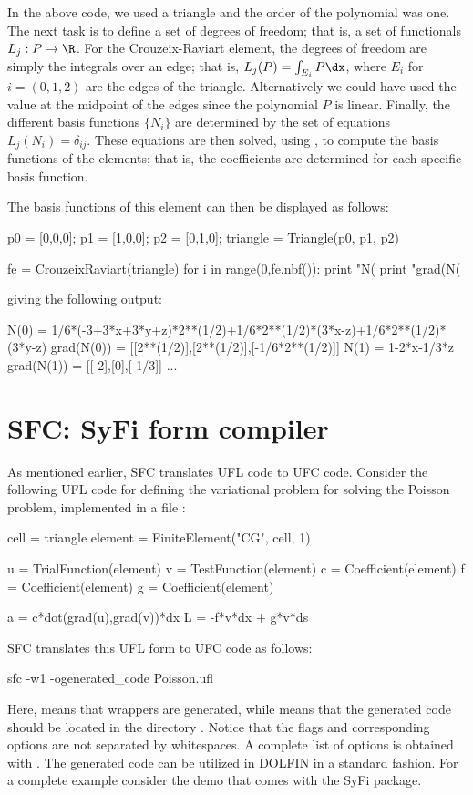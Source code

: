 In the above code, we used a triangle and the order of the polynomial
was one. The next task is to define a set of degrees of freedom; that is,
a set of functionals $L_j : P \rightarrow \R$.  For the Crouzeix-Raviart
element, the degrees of freedom are simply the integrals over an edge;
that is, $L_j(P) = \int_{E_i} P \dx$, where $E_i$ for $i=(0,1,2)$ are the
edges of the triangle. Alternatively we could have used the value at
the midpoint of the edges since the polynomial $P$ is linear.  Finally,
the different basis functions $\{N_i\}$ are determined by the set of
equations $L_j(N_i) = \delta_{ij}$.  These equations are then solved,
using , to compute the basis functions of the elements;
that is, the coefficients \emp{[a0\_0, a0\_1, a0\_2]} are determined for
each specific basis function.

The basis functions of this element can then be displayed as follows:
\begin{python}
p0 = [0,0,0]; p1 = [1,0,0]; p2 = [0,1,0];
triangle = Triangle(p0, p1, p2)

fe = CrouzeixRaviart(triangle)
for i in range(0,fe.nbf()):
  print "N(%
  print "grad(N(%
\end{python}
giving the following output:
\begin{c++}
N(0)       =  1/6*(-3+3*x+3*y+z)*2**(1/2)+1/6*2**(1/2)*(3*x-z)+1/6*2**(1/2)*(3*y-z)
grad(N(0)) =  [[2**(1/2)],[2**(1/2)],[-1/6*2**(1/2)]]
N(1)       =  1-2*x-1/3*z
grad(N(1)) =  [[-2],[0],[-1/3]]
...
\end{c++}

\section{SFC: SyFi form compiler}

As mentioned earlier, SFC translates UFL code to UFC code. Consider the
following UFL code for defining the variational problem for solving the
Poisson problem, implemented in a file :
\begin{python}
cell = triangle
element = FiniteElement("CG", cell, 1)

u = TrialFunction(element)
v = TestFunction(element)
c = Coefficient(element)
f = Coefficient(element)
g = Coefficient(element)

a = c*dot(grad(u),grad(v))*dx
L = -f*v*dx + g*v*ds
\end{python}
SFC translates this UFL form to UFC code as follows:
\begin{bash}
sfc -w1  -ogenerated_code Poisson.ufl
\end{bash}
Here,  means that \dolfin wrappers are generated, while
 means that the generated code should be
located in the directory . Notice that the flags
and corresponding options are not separated by whitespaces. A complete
list of options is obtained with .  The generated code can be
utilized in DOLFIN in a standard fashion.  For a complete example consider
the demo  that comes with the SyFi package.

